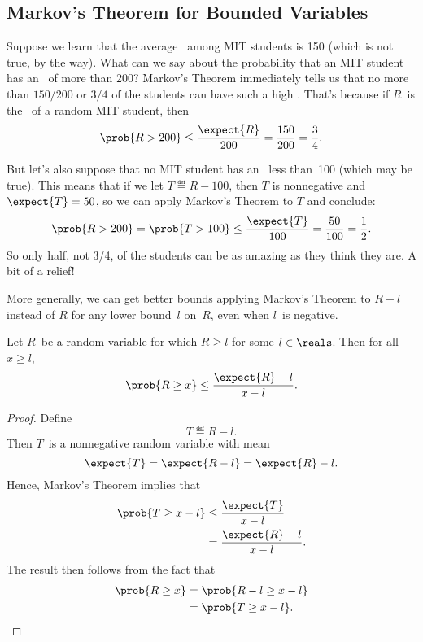 \subsection{Markov's Theorem for Bounded Variables}

Suppose we learn that the average \IQ\ among MIT students is 150
(which is not true, by the way).  What can we say about the
probability that an MIT student has an \IQ\ of more than 200?
Markov's Theorem immediately tells us that no more than $150/200$ or
$3/4$ of the students can have such a high \IQ.  That's because if
$R$~is the \IQ\ of a random MIT student, then
\[
    \prob{R > 200} \leq \frac{\expect{R}}{200}= \frac{150}{200} = \frac{3}{4}.
\]

But let's also suppose that no MIT student has an \IQ\ less than~100
(which may be true).  This means that if we let $T \eqdef R-100$, then
$T$ is nonnegative and $\expect{T} = 50$, so we can apply Markov's
Theorem to $T$ and conclude:
\[
\prob{R > 200} = \prob{T > 100} \leq \frac{\expect{T}}{100}= \frac{50}{100} =
\frac{1}{2}.
\]
So only half, not 3/4, of the students can be as amazing as they think
they are.  A bit of a relief!

More generally, we can get better bounds applying Markov's Theorem to
$R-l$ instead of $R$ for any lower bound~$l$ on~$R$, even when $l$~is
negative.

\begin{theorem}\label{thm:18C1}
Let $R$~be a random variable for which $R \ge l$ for some $l \in
\reals$.  Then for all~$x \ge l$,
\begin{equation*}
    \prob{R \ge x} \le \frac{\expect{R} - l}{x - l}.
\end{equation*}
\end{theorem}

\begin{proof}
Define
\begin{equation*}
    T \eqdef R - l.
\end{equation*}
Then $T$~is a nonnegative random variable with mean
\begin{equation*}
\expect{T} = \expect{R - l} = \expect{R} - l.
\end{equation*}
Hence, Markov's Theorem implies that
\begin{align*}
\prob{T \ge x - l}
    &\le \frac{\expect{T}}{x - l} \\
    &=   \frac{\expect{R} - l}{x - l}.
\end{align*}
The result then follows from the fact that
\begin{align*}
\prob{R \ge x}
    &= \prob{R - l \ge x - l} \\
    &= \prob{T \ge x - l}. \qedhere
\end{align*}
\end{proof}

